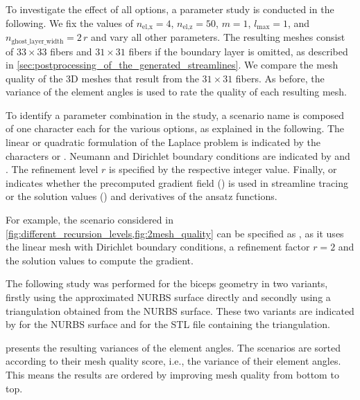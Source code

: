 To investigate the effect of all options, a parameter study is conducted in the following. We fix the values of $n_\text{el,x}=4$, $n_\text{el,z}=50$, $m=1$, $l_\text{max}=1$, and $n_\text{ghost\_layer\_width}=2\,r$ and vary all other parameters. The resulting meshes consist of $33 \times 33$ fibers and $31 \times 31$ fibers if the boundary layer is omitted, as described in \cref{sec:postprocessing_of_the_generated_streamlines}. We compare the mesh quality of the 3D meshes that result from the $31 \times 31$ fibers.
As before, the variance of the element angles is used to rate the quality of each resulting mesh.

To identify a parameter combination in the study, a scenario name is composed of one character each for the various options, as explained in the following.
The linear or quadratic formulation of the Laplace problem is indicated by the characters \say{$\ell$} or . Neumann and Dirichlet boundary conditions are indicated by  and . The refinement level $r$ is specified by the respective integer value. Finally,  or   indicates whether the precomputed gradient field () is used in  streamline tracing or the solution values () and derivatives of the ansatz functions.

For example, the scenario considered in \cref{fig:different_recursion_levels,fig:2mesh_quality} can be specified as , as it uses the linear mesh with Dirichlet boundary conditions, a refinement factor $r=2$ and the solution values to compute the gradient.

The following study was performed for the biceps geometry in two variants, firstly using the approximated NURBS surface directly and secondly using a triangulation obtained from the NURBS surface. These two variants are indicated by  for the NURBS surface and  for the STL file containing the triangulation.

 presents the resulting variances of the element angles.
The scenarios are sorted according to their mesh quality score, i.e., the variance of their element angles. This means the results are ordered by improving mesh quality from bottom to top.

